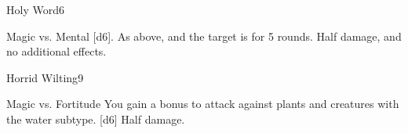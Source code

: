\begin{spellsection}{Holy Word}{6}
    \begin{spellheader}
    \end{spellheader}
    \begin{spellcontent}
        \begin{spelltargetinginfo}
        \end{spelltargetinginfo}
        \begin{spelleffects}
            \begin{spellattack}{Magic vs. Mental}
                \spellsuccess {}[d6].
                \spellcritical As above, and the target is \dazed for 5 rounds.
                \spellfailure Half damage, and no additional effects.
            \end{spellattack}
        \end{spelleffects}
    \end{spellcontent}
    \begin{spellfooter}
        \miscastexplode
    \end{spellfooter}
\end{spellsection}

\begin{spellsection}{Horrid Wilting}{9}
    \begin{spellheader}
    \end{spellheader}
    \begin{spellcontent}
        \begin{spelltargetinginfo}
        \end{spelltargetinginfo}
        \begin{spelleffects}
            \begin{spellattack}{Magic vs. Fortitude}
                \spellspecial You gain a  bonus to attack against plants and creatures with the water subtype.
                \spellsuccess {}[d6]
                \spellfailure Half damage.
            \end{spellattack}
        \end{spelleffects}
    \end{spellcontent}
    \begin{spellfooter}
        \miscastyou
    \end{spellfooter}
\end{spellsection}

